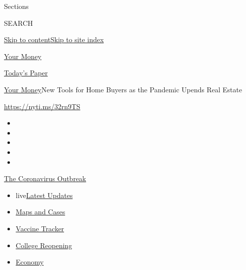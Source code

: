 Sections

SEARCH

\protect\hyperlink{site-content}{Skip to
content}\protect\hyperlink{site-index}{Skip to site index}

\href{https://www.nytimes3xbfgragh.onion/section/your-money}{Your Money}

\href{https://myaccount.nytimes3xbfgragh.onion/auth/login?response_type=cookie\&client_id=vi}{}

\href{https://www.nytimes3xbfgragh.onion/section/todayspaper}{Today's
Paper}

\href{/section/your-money}{Your Money}\textbar{}New Tools for Home
Buyers as the Pandemic Upends Real Estate

\url{https://nyti.ms/32rn9TS}

\begin{itemize}
\item
\item
\item
\item
\item
\end{itemize}

\href{https://www.nytimes3xbfgragh.onion/news-event/coronavirus?action=click\&pgtype=Article\&state=default\&region=TOP_BANNER\&context=storylines_menu}{The
Coronavirus Outbreak}

\begin{itemize}
\tightlist
\item
  live\href{https://www.nytimes3xbfgragh.onion/2020/08/03/world/coronavirus-covid-19.html?action=click\&pgtype=Article\&state=default\&region=TOP_BANNER\&context=storylines_menu}{Latest
  Updates}
\item
  \href{https://www.nytimes3xbfgragh.onion/interactive/2020/us/coronavirus-us-cases.html?action=click\&pgtype=Article\&state=default\&region=TOP_BANNER\&context=storylines_menu}{Maps
  and Cases}
\item
  \href{https://www.nytimes3xbfgragh.onion/interactive/2020/science/coronavirus-vaccine-tracker.html?action=click\&pgtype=Article\&state=default\&region=TOP_BANNER\&context=storylines_menu}{Vaccine
  Tracker}
\item
  \href{https://www.nytimes3xbfgragh.onion/2020/08/02/us/covid-college-reopening.html?action=click\&pgtype=Article\&state=default\&region=TOP_BANNER\&context=storylines_menu}{College
  Reopening}
\item
  \href{https://www.nytimes3xbfgragh.onion/live/2020/08/03/business/stock-market-today-coronavirus?action=click\&pgtype=Article\&state=default\&region=TOP_BANNER\&context=storylines_menu}{Economy}
\end{itemize}


